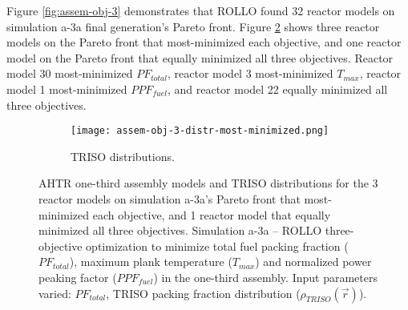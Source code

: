 Figure \ref{fig:assem-obj-3} demonstrates that \gls{ROLLO} found 32 reactor models on 
simulation a-3a final generation's Pareto front. 
Figure \ref{fig:assem-obj-3-most-minimized} shows three reactor models on the 
Pareto front that most-minimized each objective, and one reactor model on the 
Pareto front that equally minimized all three objectives. 
Reactor model 30 most-minimized $PF_{total}$, reactor model 3 most-minimized $T_{max}$, 
reactor model 1 most-minimized $PPF_{fuel}$, and reactor model 22 equally minimized 
all three objectives. 
\begin{figure}[htbp!]
    \centering
    \begin{subfigure}{\textwidth}
    \centering
    \texttt{[image: assem-obj-3-distr-most-minimized.png]}
    \caption{TRISO distributions.}
    \label{fig:assem-obj-3-most-minimized-distr}
    \end{subfigure}
    \caption{AHTR one-third assembly models and TRISO distributions for the 3 reactor 
    models on simulation a-3a's Pareto front that most-minimized each objective, and 
    1 reactor model that equally minimized all three objectives.
    Simulation a-3a -- ROLLO three-objective optimization to minimize total fuel packing 
    fraction ($PF_{total}$), maximum plank temperature ($T_{max}$) and 
    normalized power peaking factor ($PPF_{fuel}$) in the one-third assembly. 
    Input parameters varied: $PF_{total}$, TRISO packing fraction distribution
    ($\rho_{TRISO}(\vec{r})$).}
    \label{fig:assem-obj-3-most-minimized}
\end{figure}
